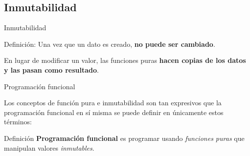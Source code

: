 \documentclass{beamer}
\begin{document}
\subsection{Inmutabilidad}
\begin{frame}{Inmutabilidad}
    
    \begin{block}{Definición:}
     Una vez que un dato es creado, \textbf{no puede ser cambiado}.    
    \end{block}
        
    En lugar de modificar un valor, las funciones puras \textbf{hacen copias de los datos y las pasan como resultado}.


    \vspace{0.3cm}
    \begin{center}
    \end{center}
\end{frame}

\begin{frame}{Programación funcional}

    Los conceptos de función pura e inmutabilidad son tan expresivos que la programación funcional en sí misma se puede definir en únicamente estos términos:

    \vspace{0.5cm}

    \begin{block}{Definición}
        \textbf{Programación funcional} es programar usando \textit{funciones puras} que manipulan valores \textit{inmutables}.
    \end{block}
    
\end{frame}
\end{document}

